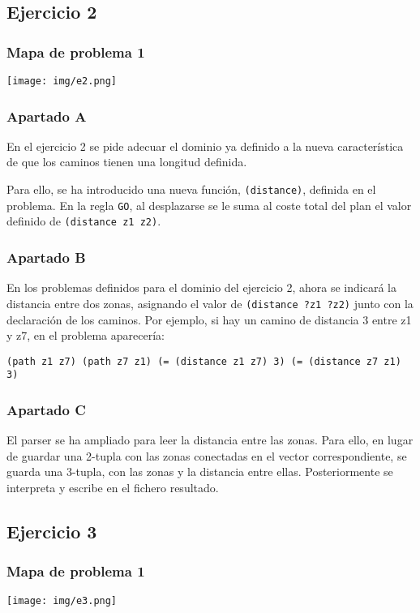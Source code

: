 \documentclass[11pt,a4paper]{article}
\begin{document}
\subsection{Ejercicio 2}
\subsubsection{Mapa de problema 1}
\texttt{[image: img/e2.png]}
\subsubsection{Apartado A}
En el ejercicio 2 se pide adecuar el dominio ya definido a la nueva característica de que los caminos tienen una 
longitud definida.

Para ello, se ha introducido una nueva función, \texttt{(distance)}, definida en el problema.
En la regla \texttt{GO}, al desplazarse se le suma al coste total del plan el valor definido de \texttt{(distance z1 z2)}.

\subsubsection{Apartado B}
En los problemas definidos para el dominio del ejercicio 2, ahora se indicará la distancia entre dos zonas, asignando el valor de
\texttt{(distance ?z1 ?z2)} junto con la declaración de los caminos. Por ejemplo, si hay un camino de distancia 3 entre z1 y z7, en 
el problema aparecería:

\texttt{(path z1 z7) (path z7 z1) (= (distance z1 z7) 3) (= (distance z7 z1) 3)}

\subsubsection{Apartado C}
El parser se ha ampliado para leer la distancia entre las zonas. Para ello, en lugar de guardar una 2-tupla con las zonas conectadas en el vector correspondiente, se guarda una 3-tupla, con las zonas y la distancia entre ellas. Posteriormente se interpreta y escribe en el 
fichero resultado.


\subsection{Ejercicio 3}
\subsubsection{Mapa de problema 1}
\texttt{[image: img/e3.png]}
\end{document}
